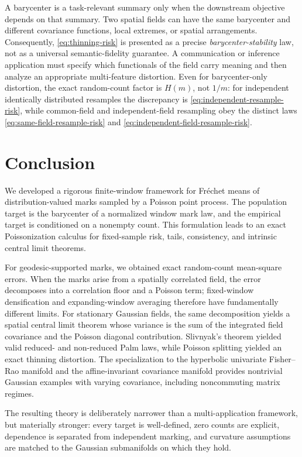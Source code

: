 \documentclass[11pt,a4paper]{article}
\theoremstyle{remark}
\begin{document}
A barycenter is a task-relevant summary only when the downstream objective depends on that summary.  Two spatial fields can have the same barycenter and different covariance functions, local extremes, or spatial arrangements.  Consequently, \eqref{eq:thinning-risk} is presented as a precise \emph{barycenter-stability} law, not as a universal semantic-fidelity guarantee.  A communication or inference application must specify which functionals of the field carry meaning and then analyze an appropriate multi-feature distortion.  Even for barycenter-only distortion, the exact random-count factor is \(H(m)\), not \(1/m\): for independent identically distributed resamples the discrepancy is \eqref{eq:independent-resample-risk}, while common-field and independent-field resampling obey the distinct laws \eqref{eq:same-field-resample-risk} and \eqref{eq:independent-field-resample-risk}.

\section{Conclusion}
\label{sec:conclusion}

We developed a rigorous finite-window framework for Fr\'echet means of distribution-valued marks sampled by a Poisson point process.  The population target is the barycenter of a normalized window mark law, and the empirical target is conditioned on a nonempty count.  This formulation leads to an exact Poissonization calculus for fixed-sample risk, tails, consistency, and intrinsic central limit theorems.

For geodesic-supported marks, we obtained exact random-count mean-square errors.  When the marks arise from a spatially correlated field, the error decomposes into a correlation floor and a Poisson term; fixed-window densification and expanding-window averaging therefore have fundamentally different limits.  For stationary Gaussian fields, the same decomposition yields a spatial central limit theorem whose variance is the sum of the integrated field covariance and the Poisson diagonal contribution.  Slivnyak's theorem yielded valid reduced- and non-reduced Palm laws, while Poisson splitting yielded an exact thinning distortion.  The specialization to the hyperbolic univariate Fisher--Rao manifold and the affine-invariant covariance manifold provides nontrivial Gaussian examples with varying covariance, including noncommuting matrix regimes.

The resulting theory is deliberately narrower than a multi-application framework, but materially stronger: every target is well-defined, zero counts are explicit, dependence is separated from independent marking, and curvature assumptions are matched to the Gaussian submanifolds on which they hold.
\end{document}
